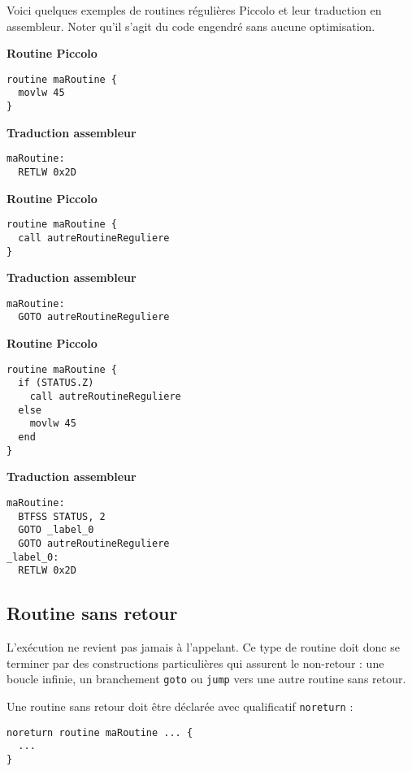 Voici quelques exemples de routines régulières Piccolo et leur traduction en assembleur. Noter qu'il s'agit du code engendré sans aucune optimisation.
\begin{multicols}{2}
\textbf{Routine Piccolo}
\begin{lstlisting}[language=piccolo]
routine maRoutine {
  movlw 45
}
\end{lstlisting}
\columnbreak
\textbf{Traduction assembleur}
\begin{lstlisting}[language=assembleur]
maRoutine:
  RETLW 0x2D
\end{lstlisting}
\end{multicols}

\begin{multicols}{2}
\textbf{Routine Piccolo}
\begin{lstlisting}[language=piccolo]
routine maRoutine {
  call autreRoutineReguliere
}
\end{lstlisting}
\columnbreak
\textbf{Traduction assembleur}
\begin{lstlisting}[language=assembleur]
maRoutine:
  GOTO autreRoutineReguliere
\end{lstlisting}
\end{multicols}


\begin{multicols}{2}
\textbf{Routine Piccolo}
\begin{lstlisting}[language=piccolo]
routine maRoutine {
  if (STATUS.Z)
    call autreRoutineReguliere
  else
    movlw 45
  end
}
\end{lstlisting}
\columnbreak
\textbf{Traduction assembleur}
\begin{lstlisting}[language=assembleur]
maRoutine:
  BTFSS STATUS, 2
  GOTO _label_0
  GOTO autreRoutineReguliere
_label_0:
  RETLW 0x2D
\end{lstlisting}
\end{multicols}


\subsection{Routine sans retour}

L’exécution ne revient pas jamais à l’appelant. Ce type de routine doit donc se terminer par des constructions particulières qui assurent le non-retour : une boucle infinie, un branchement \texttt{goto} ou \texttt{jump} vers une autre routine sans retour.

Une routine sans retour doit être déclarée avec qualificatif \texttt{noreturn} :
\begin{lstlisting}[language=piccolo]
noreturn routine maRoutine ... {
  ...
}
\end{lstlisting}

